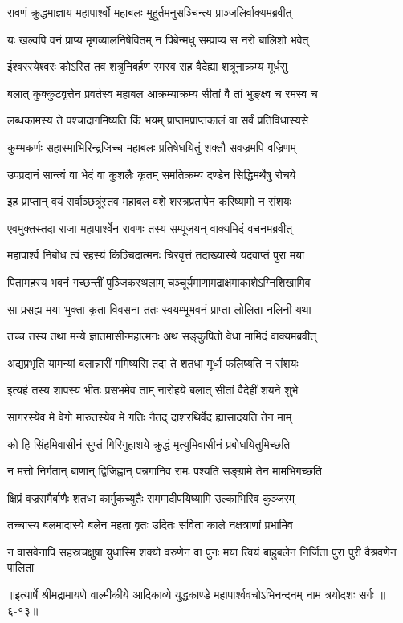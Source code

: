 
\twolineshloka
{रावणं क्रुद्धमाज्ञाय महापार्श्वो महाबलः}
{मुहूर्तमनुसञ्चिन्त्य प्राञ्जलिर्वाक्यमब्रवीत्} %

\twolineshloka
{यः खल्वपि वनं प्राप्य मृगव्यालनिषेवितम्}
{न पिबेन्मधु सम्प्राप्य स नरो बालिशो भवेत्} %

\twolineshloka
{ईश्वरस्येश्वरः कोऽस्ति तव शत्रुनिबर्हण}
{रमस्व सह वैदेह्या शत्रूनाक्रम्य मूर्धसु} %

\twolineshloka
{बलात् कुक्कुटवृत्तेन प्रवर्तस्व महाबल}
{आक्रम्याक्रम्य सीतां वै तां भुङ्क्ष्व च रमस्व च} %

\twolineshloka
{लब्धकामस्य ते पश्चादागमिष्यति किं भयम्}
{प्राप्तमप्राप्तकालं वा सर्वं प्रतिविधास्यसे} %

\twolineshloka
{कुम्भकर्णः सहास्माभिरिन्द्रजिच्च महाबलः}
{प्रतिषेधयितुं शक्तौ सवज्रमपि वज्रिणम्} %

\twolineshloka
{उपप्रदानं सान्त्वं वा भेदं वा कुशलैः कृतम्}
{समतिक्रम्य दण्डेन सिद्धिमर्थेषु रोचये} %

\twolineshloka
{इह प्राप्तान् वयं सर्वाञ्छत्रूंस्तव महाबल}
{वशे शस्त्रप्रतापेन करिष्यामो न संशयः} %

\twolineshloka
{एवमुक्तस्तदा राजा महापार्श्वेन रावणः}
{तस्य सम्पूजयन् वाक्यमिदं वचनमब्रवीत्} %

\twolineshloka
{महापार्श्व निबोध त्वं रहस्यं किञ्चिदात्मनः}
{चिरवृत्तं तदाख्यास्ये यदवाप्तं पुरा मया} %

\twolineshloka
{पितामहस्य भवनं गच्छन्तीं पुञ्जिकस्थलाम्}
{चञ्चूर्यमाणामद्राक्षमाकाशेऽग्निशिखामिव} %

\twolineshloka
{सा प्रसह्य मया भुक्ता कृता विवसना ततः}
{स्वयम्भूभवनं प्राप्ता लोलिता नलिनी यथा} %

\twolineshloka
{तच्च तस्य तथा मन्ये ज्ञातमासीन्महात्मनः}
{अथ सङ्कुपितो वेधा मामिदं वाक्यमब्रवीत्} %

\twolineshloka
{अद्यप्रभृति यामन्यां बलान्नारीं गमिष्यसि}
{तदा ते शतधा मूर्धा फलिष्यति न संशयः} %

\twolineshloka
{इत्यहं तस्य शापस्य भीतः प्रसभमेव ताम्}
{नारोहये बलात् सीतां वैदेहीं शयने शुभे} %

\twolineshloka
{सागरस्येव मे वेगो मारुतस्येव मे गतिः}
{नैतद् दाशरथिर्वेद ह्यासादयति तेन माम्} %

\twolineshloka
{को हि सिंहमिवासीनं सुप्तं गिरिगुहाशये}
{क्रुद्धं मृत्युमिवासीनं प्रबोधयितुमिच्छति} %

\twolineshloka
{न मत्तो निर्गतान् बाणान् द्विजिह्वान् पन्नगानिव}
{रामः पश्यति सङ्ग्रामे तेन मामभिगच्छति} %

\twolineshloka
{क्षिप्रं वज्रसमैर्बाणैः शतधा कार्मुकच्युतैः}
{राममादीपयिष्यामि उल्काभिरिव कुञ्जरम्} %

\twolineshloka
{तच्चास्य बलमादास्ये बलेन महता वृतः}
{उदितः सविता काले नक्षत्राणां प्रभामिव} %

\twolineshloka
{न वासवेनापि सहस्रचक्षुषा युधास्मि शक्यो वरुणेन वा पुनः}
{मया त्वियं बाहुबलेन निर्जिता पुरा पुरी वैश्रवणेन पालिता} %


॥इत्यार्षे श्रीमद्रामायणे वाल्मीकीये आदिकाव्ये युद्धकाण्डे महापार्श्ववचोऽभिनन्दनम् नाम त्रयोदशः सर्गः ॥६-१३॥
